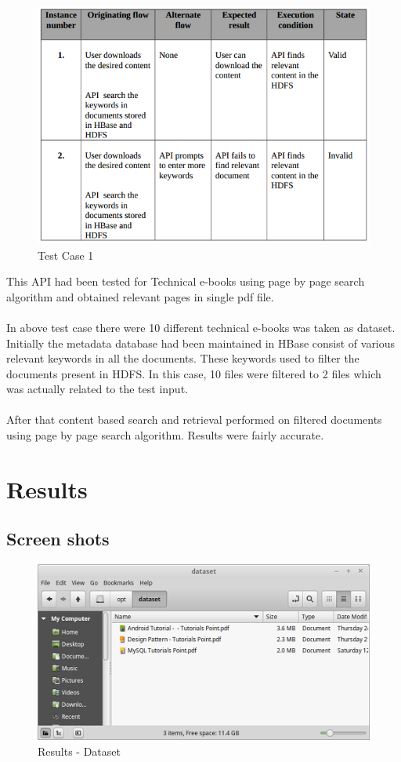 \documentclass[oneside,a4paper,12pt]{report}
\begin{document}
{\begin{figure}[h]
\includegraphics{test-case-3}
\caption{Test Case 1}
\end{figure}

This API had been tested for Technical e-books using page by page search algorithm and obtained relevant pages in single pdf file.\\\\
In above test case there were 10 different technical e-books was taken as dataset. Initially the metadata database had been maintained  in HBase consist of various relevant keywords in all the documents. These keywords used to filter the documents present in HDFS. In this case, 10 files were filtered to 2 files which was actually related to the test input.\\\\
After that content based search and retrieval performed on filtered documents using page by page search algorithm. Results were fairly accurate.


\chapter{Results}

\section{Screen shots}

\begin{figure}[H]
\includegraphics{results-dataset}
\caption{Results - Dataset}
\end{figure}

}
\end{document}
